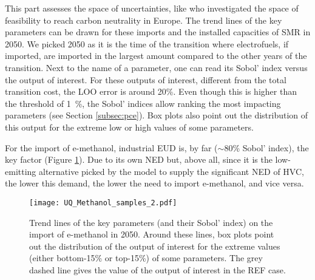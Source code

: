 This part assesses the space of uncertainties, like \citet{pickering2022diversity} who investigated the space of feasibility to reach carbon neutrality in Europe. The trend lines of the key parameters can be drawn for these imports and the installed capacities of \gls{SMR} in 2050. We picked 2050 as it is the time of the transition where electrofuels, if imported, are imported in the largest amount compared to the other years of the transition. Next to the name of a parameter, one can read its Sobol' index versus the output of interest. For these outputs of interest, different from the total transition cost, the \gls{LOO} error is around 20\%. Even though this is higher than the threshold of \SI{1}{\%}, the Sobol' indices allow ranking the most impacting parameters (see Section \ref{subsec:pce}). Box plots also point out the distribution of this output for the extreme low or high values of some parameters.

For the import of e-methanol, industrial \gls{EUD} is, by far (\ie $\sim$80\% Sobol' index), the key factor (Figure \ref{fig:results_uq_samples_methanol}). Due to its own \gls{NED} but, above all, since it is the low-emitting alternative picked by the model to supply the significant \gls{NED} of \gls{HVC}, the lower this demand, the lower the need to import e-methanol, and vice versa. 

\begin{figure}[htbp!]
\centering
\texttt{[image: UQ\_Methanol\_samples\_2.pdf]}
\caption{Trend lines of the key parameters (and their Sobol' index) on the import of e-methanol in 2050. Around these lines, box plots point out the distribution of the output of interest for the extreme values (either bottom-15\% or top-15\%) of some parameters. The grey dashed line gives the value of the output of interest in the REF case. }
\label{fig:results_uq_samples_methanol}
\end{figure}

